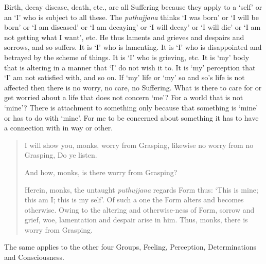 Birth, decay disease, death, etc., are all Suffering because they apply to a `self' or an `I' who is subject to all these. The \emph{puthujjana} thinks `I was born' or `I will be born' or `I am diseased' or `I am decaying' or `I will decay' or `I will die' or `I am not getting what I want', etc. He thus laments and grieves and despairs and sorrows, and so suffers. It is `I' who is lamenting. It is `I' who is disappointed and betrayed by the scheme of things. It is `I' who is grieving, etc. It is `my' body that is altering in a manner that `I' do not wish it to. It is `my' perception that `I' am not satisfied with, and so on. If `my' life or `my' so and so's life is not affected then there is no worry, no care, no Suffering. What is there to care for or get worried about a life that does not concern `me'? For a world that is not `mine'? There is attachment to something only because that something is `mine' or has to do with `mine'. For me to be concerned about something it has to have a connection with  in  way or other.

\begin{quote}
I will show you, monks, worry from Grasping, likewise no worry from no Grasping, Do ye listen.

And how, monks, is there worry from Grasping?

Herein, monks, the untaught \emph{puthujjana} regards Form thus: `This is mine; this am I; this is my self'. Of such a one the Form alters and becomes otherwise. Owing to the altering and otherwise-ness of Form, sorrow and grief, woe, lamentation and despair arise in him. Thus, monks, there is worry from Grasping.
\end{quote}

The same applies to the other four Groups, Feeling, Perception, Determinations and Consciousness.

